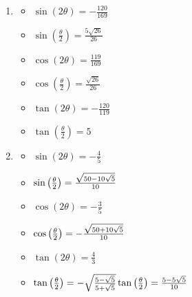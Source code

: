 \begin{enumerate}
\begin{multicols}{3}
\begin{itemize}
\end{itemize}

\end{multicols}

\item \begin{multicols}{3}

\begin{itemize}

\item $\sin(2\theta) = -\frac{120}{169}$
\item $\sin\left(\frac{\theta}{2}\right) = \frac{5\sqrt{26}}{26}$
\item $\cos(2\theta) = \frac{119}{169}$
\item $\cos\left(\frac{\theta}{2}\right) = \frac{\sqrt{26}}{26}$
\item $\tan(2\theta)=-\frac{120}{119}$
\item $\tan\left(\frac{\theta}{2}\right) = 5$

\end{itemize}

\end{multicols}

\item \begin{multicols}{3}

\begin{itemize}

\item $\sin(2\theta) = -\frac{4}{5}$
\item $\sin\left(\frac{\theta}{2}\right) = \frac{\sqrt{50-10\sqrt{5}}}{10} \\ \phantom{\tan\left(\frac{\theta}{2}\right) =\frac{5-5\sqrt{5}}{10}}$ 

\item $\cos(2\theta) = -\frac{3}{5}$
\item $\cos\left(\frac{\theta}{2}\right)= -\frac{\sqrt{50+10\sqrt{5}}}{10} \\ \phantom{\tan\left(\frac{\theta}{2}\right) =\frac{5-5\sqrt{5}}{10}}$ 
\item $\tan(2\theta)=\frac{4}{3}$
\item $\tan\left(\frac{\theta}{2}\right) =  -\sqrt{\frac{5-\sqrt{5}}{5+\sqrt{5}}} \\ \tan\left(\frac{\theta}{2}\right) =\frac{5-5\sqrt{5}}{10}$

\end{itemize}

\end{multicols}


\end{enumerate}
